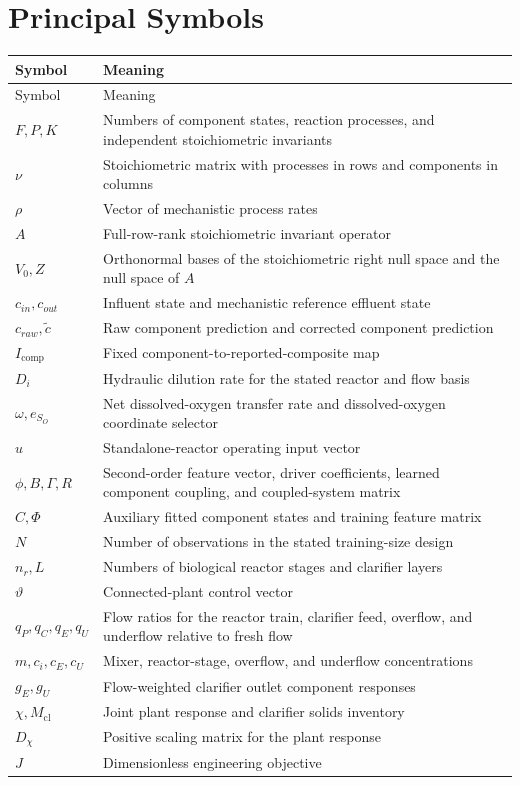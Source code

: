 \documentclass[12pt,twoside]{book}
\begin{document}
\chapter*{Principal Symbols}
\begin{longtable}{p{}p{}}
\toprule
Symbol & Meaning \\
\midrule
\endfirsthead
\toprule Symbol & Meaning \\
\midrule
\endhead
$F,P,K$ & Numbers of component states, reaction processes, and independent stoichiometric invariants \\
$\nu$ & Stoichiometric matrix with processes in rows and components in columns \\
$\rho$ & Vector of mechanistic process rates \\
$A$ & Full-row-rank stoichiometric invariant operator \\
$V_0,Z$ & Orthonormal bases of the stoichiometric right null space and the null space of $A$ \\
$c_{in},c_{out}$ & Influent state and mechanistic reference effluent state \\
$c_{raw},\widetilde c$ & Raw component prediction and corrected component prediction \\
$I_{\mathrm{comp}}$ & Fixed component-to-reported-composite map \\
$D_i$ & Hydraulic dilution rate for the stated reactor and flow basis \\
$\omega,e_{S_O}$ & Net dissolved-oxygen transfer rate and dissolved-oxygen coordinate selector \\
$u$ & Standalone-reactor operating input vector \\
$\phi,B,\Gamma,R$ & Second-order feature vector, driver coefficients, learned component coupling, and coupled-system matrix \\
$\widehat C,\Phi$ & Auxiliary fitted component states and training feature matrix \\
$N$ & Number of observations in the stated training-size design \\
$n_r,L$ & Numbers of biological reactor stages and clarifier layers \\
$\vartheta$ & Connected-plant control vector \\
$q_P,q_C,q_E,q_U$ & Flow ratios for the reactor train, clarifier feed, overflow, and underflow relative to fresh flow \\
$m,c_i,c_E,c_U$ & Mixer, reactor-stage, overflow, and underflow concentrations \\
$g_E,g_U$ & Flow-weighted clarifier outlet component responses \\
$\chi,M_{\mathrm{cl}}$ & Joint plant response and clarifier solids inventory \\
$D_\chi$ & Positive scaling matrix for the plant response \\
$J$ & Dimensionless engineering objective \\
\bottomrule
\end{longtable}
\end{document}
